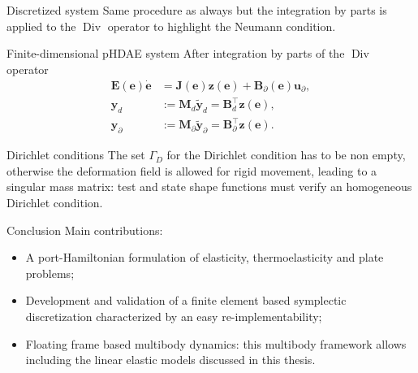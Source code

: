 \documentclass[aspectratio=169]{ISAE-Beamer}
\DeclareMathOperator*{\Div}{Div}
\begin{document}
\begin{frame}{Discretized system}
Same procedure as always but the integration by parts is applied to the $\Div$ operator to highlight the Neumann condition.
\begin{exampleblock}{Finite-dimensional pHDAE system}
	\setlength{\abovedisplayskip}{3pt}
	\setlength{\belowdisplayskip}{3pt}
	After integration by parts of the $\Div$ operator
	\begin{equation*}
	\begin{aligned}
	\mathbf{E}(\mathbf{e}) \dot{\mathbf{e}} &= \mathbf{J}(\mathbf{e}) \mathbf{z}(\mathbf{e}) + \mathbf{B}_\partial(\mathbf{e}) \mathbf{u}_\partial, \\
	\mathbf{y}_d &:= \mathbf{M}_d \widetilde{\mathbf{y}}_d = \mathbf{B}_d^\top \mathbf{z}(\mathbf{e}),  \\
	\mathbf{y}_\partial &:= \mathbf{M}_\partial \widetilde{\mathbf{y}}_\partial = \mathbf{B}_\partial^\top \mathbf{z}(\mathbf{e}).
	\end{aligned}
	\end{equation*}
\end{exampleblock}

\begin{block}{Dirichlet conditions}
	The set $\Gamma_D$ for the Dirichlet condition has to be non empty, otherwise the deformation field is allowed for rigid movement, leading to a singular mass matrix: test and state shape functions must verify an homogeneous Dirichlet condition. 
\end{block}
\end{frame}




\begin{frame}{Conclusion}
Main contributions:
\begin{itemize}
\item A port-Hamiltonian formulation of elasticity, thermoelasticity and plate problems;
\item Development and validation of a finite element based symplectic discretization characterized by an easy re-implementability;
\item Floating frame based multibody dynamics: this multibody framework allows including the linear elastic models discussed in this thesis.
\end{itemize}

\end{frame}
\end{document}
